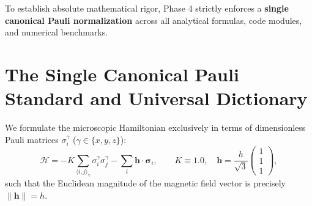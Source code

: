To establish absolute mathematical rigor, Phase 4 strictly enforces a \textbf{single canonical Pauli normalization} across all analytical formulas, code modules, and numerical benchmarks.

\section{The Single Canonical Pauli Standard and Universal Dictionary}
\label{sec:phase4_dictionary}

We formulate the microscopic Hamiltonian exclusively in terms of dimensionless Pauli matrices $\sigma_i^\gamma$ ($\gamma \in \{x, y, z\}$):
\begin{equation}
\label{eq:phase4_canonical_hamiltonian}
\mathcal{H} = - K \sum_{\langle i, j \rangle_\gamma} \sigma_i^\gamma \sigma_j^\gamma - \sum_{i} \bm{h} \cdot \bm{\sigma}_i, \qquad K \equiv 1.0, \quad \bm{h} = \frac{h}{\sqrt{3}}\begin{pmatrix} 1 \\ 1 \\ 1 \end{pmatrix},
\end{equation}
such that the Euclidean magnitude of the magnetic field vector is precisely $\|\bm{h}\| = h$.

